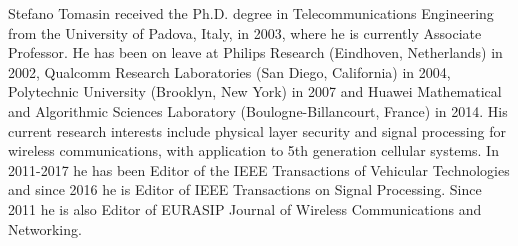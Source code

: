 \documentclass[draftcls,journal,onecolumn]{IEEEtran}
\begin{document}
\begin{IEEEbiography}%
{Stefano Tomasin} received the Ph.D. degree in Telecommunications Engineering from the University of Padova, Italy, in 2003, where he is currently Associate Professor. He has been on leave at Philips Research (Eindhoven, Netherlands) in 2002, Qualcomm Research Laboratories (San Diego, California) in 2004, Polytechnic University (Brooklyn, New York) in 2007 and Huawei Mathematical and Algorithmic Sciences Laboratory (Boulogne-Billancourt, France) in 2014. His current research interests include physical layer security and signal processing for wireless communications, with application to 5th generation cellular systems. In 2011-2017 he has been Editor of the IEEE Transactions of Vehicular Technologies and since 2016 he is Editor of IEEE Transactions on Signal Processing. Since 2011 he is also Editor of EURASIP Journal of Wireless Communications and Networking.
\end{IEEEbiography}
\end{document}
